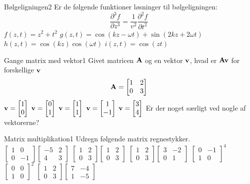 \begin{opgave}{Bølgeligningen}{2}
Er de følgende funktioner løsninger til bølgeligningen: 
$$
\frac{\partial^3 f}{\partial z^3} = \frac{1}{v^2}\frac{\partial^2 f}{\partial t^2}
$$
\opg $f(z,t) = z^2+t^2$
\opg $g(z,t) = \cos(kz-\omega t)+\sin(2kz+2\omega t)$
\opg $h(z,t) = \cos(kz)\cos(\omega t)$
\opg $i(z,t) = \cos(zt)$
\end{opgave}

\begin{opgave}{Gange matrix med vektor}{1}
Givet matricen $\mathbf{A}$ og en vektor $\mathbf{v}$, hvad er $\mathbf{A}\mathbf{v}$ for forskellige $\mathbf{v}$
$$
\mathbf{A} = \begin{bmatrix}
1&2\\0&3
\end{bmatrix}
$$
\opg $\mathbf{v} = \begin{bmatrix} 1 \\ 0 \end{bmatrix}$
\opg $\mathbf{v} = \begin{bmatrix} 0 \\ 1 \end{bmatrix}$
\opg $\mathbf{v} = \begin{bmatrix} 1 \\ 1 \end{bmatrix}$
\opg $\mathbf{v} = \begin{bmatrix} 1 \\ -1 \end{bmatrix}$
\opg $\mathbf{v} = \begin{bmatrix} 3 \\ 4 \end{bmatrix}$
\opg Er der noget særligt ved nogle af vektorerne?
\end{opgave}

\begin{opgave}{Matrix multiplikation}{1}
Udregn følgende matrix regnestykker.
\opg $\begin{bmatrix}
1&0\\0&-1
\end{bmatrix}
\begin{bmatrix}
-5&2\\4&3
\end{bmatrix}
$
\opg $\begin{bmatrix}
1&2\\0&3
\end{bmatrix}
\begin{bmatrix}
1&2\\0&3
\end{bmatrix}
$
\opg $\begin{bmatrix}
1&2\\0&3
\end{bmatrix}
\begin{bmatrix}
3&-2\\0&1
\end{bmatrix}
$
\opg $\begin{bmatrix}
0&-1\\1&0
\end{bmatrix}^4
$
\opg $\begin{bmatrix}
0&0\\1&0
\end{bmatrix}^2
$
\opg $\begin{bmatrix}
1&2\\0&3
\end{bmatrix}
\begin{bmatrix}
7&-4\\1&-5
\end{bmatrix}
$
\end{opgave}

